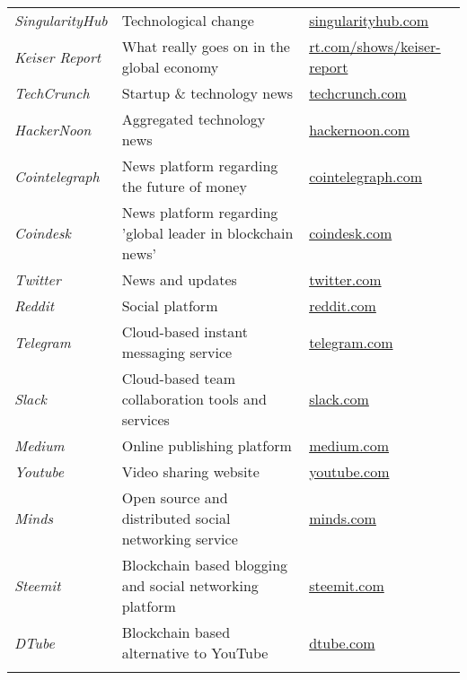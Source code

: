 \begin{landscape}
\begin{longtable}{lll}
\textit{SingularityHub} & Technological change          & \href{https://singularityhub.com}{singularityhub.com}\\
\textit{Keiser Report}  & What really goes on in the global economy & \href{https://www.rt.com/shows/keiser-report}{rt.com/shows/keiser-report}\\
\textit{TechCrunch}     & Startup \& technology news    & \href{https://techcrunch.com/}{techcrunch.com}\\
\textit{HackerNoon}     & Aggregated technology news    &\href{https://hackernoon.com/}{hackernoon.com}\\
\textit{Cointelegraph}  & News platform regarding the future of money & \href{http://https://www.cointelegraph.com}{cointelegraph.com}\\ 
\textit{Coindesk}       & News platform regarding 'global leader in blockchain news' & \href{https://www.coindesk.com/}{coindesk.com}\\
\textit{Twitter }       & News and updates              & \href{https://www.twitter.com}{twitter.com}\\ 
\textit{Reddit}         & Social platform	 & \href{https://www.reddit.com}{reddit.com}\\
\textit{Telegram }      & Cloud-based instant messaging service &\href{https://www.telegram.com}{telegram.com}\\
\textit{Slack}          & Cloud-based team collaboration tools and services  &	\href{https://www.slack.com}{slack.com}\\
\textit{Medium}         & Online publishing platform    & \href{https://www.medium.com}{medium.com}\\
\textit{Youtube}        & Video sharing website         &	\href{https://www.youtube.com}{youtube.com}\\
\textit{Minds}          & Open source and distributed social networking service & \href{https://www.minds.com/register?referrer=cryptomanuals}{minds.com}\\
\textit{Steemit}        & Blockchain based blogging and social networking platform & \href{https://www.steemit.com}{steemit.com}\\
\textit{DTube}          & Blockchain based alternative to YouTube & \href{https://www.dtube.com}{dtube.com}\\

\label{tab:social_infrastructure}
\end{longtable}



\end{landscape}

